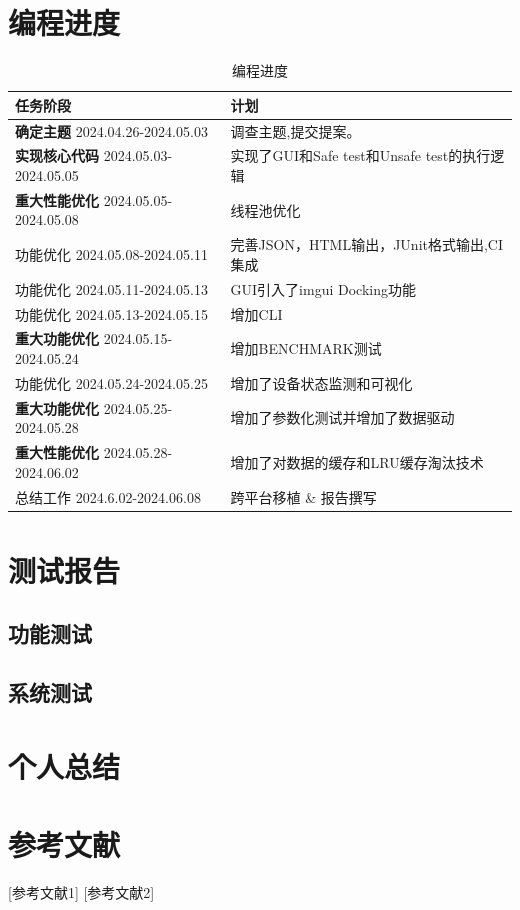 \documentclass{article}
\begin{document}
\section{编程进度}
\begin{table}[H]
    \centering
    \begin{tabular}{|l|l|}
        \toprule
        \textbf{任务阶段}                         & \textbf{计划}                       \\ \midrule
        \textbf{确定主题} 2024.04.26-2024.05.03   & 调查主题,提交提案。                        \\ \midrule
        \textbf{实现核心代码} 2024.05.03-2024.05.05 & 实现了GUI和Safe test和Unsafe test的执行逻辑 \\ \midrule
        \textbf{重大性能优化} 2024.05.05-2024.05.08 & 线程池优化                             \\ \midrule
        功能优化 2024.05.08-2024.05.11            & 完善JSON，HTML输出，JUnit格式输出,CI集成      \\ \midrule
        功能优化 2024.05.11-2024.05.13            & GUI引入了imgui Docking功能             \\ \midrule
        功能优化 2024.05.13-2024.05.15            & 增加CLI                             \\ \midrule
        \textbf{重大功能优化} 2024.05.15-2024.05.24 & 增加BENCHMARK测试                     \\ \midrule
        功能优化 2024.05.24-2024.05.25            & 增加了设备状态监测和可视化                     \\ \midrule
        \textbf{重大功能优化} 2024.05.25-2024.05.28 & 增加了参数化测试并增加了数据驱动                  \\ \midrule
        \textbf{重大性能优化} 2024.05.28-2024.06.02 & 增加了对数据的缓存和LRU缓存淘汰技术               \\ \midrule
        总结工作 2024.6.02-2024.06.08             & 跨平台移植 \& 报告撰写                     \\
        \bottomrule
    \end{tabular}
    \caption{编程进度}
\end{table}

\section{测试报告}
\subsection{功能测试}

\subsection{系统测试}

\section{个人总结}

\section{参考文献}
\begin{thebibliography}{99}
     [参考文献1]
     [参考文献2]
\end{thebibliography}
\end{document}

